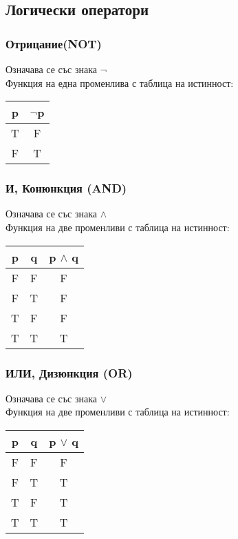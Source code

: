 \documentclass[fleqn, 12pt]{article}
\begin{document}
\subsection{Логически оператори}

\subsubsection{Отрицание(NOT)}
Означава се със знака $\neg$\\
Функция на една променлива с таблица на истинност: 
\begin{table}[htp]
  \begin{center}
    \begin{tabular}{|c|c|} 
\hline
      \textbf{p} & \textbf{$\neg$p} \\
      \hline
      T & F \\
\hline
      F & T \\
\hline
    \end{tabular}
  \end{center}
\end{table}

\subsubsection{И, Конюнкция (AND)}
Означава се със знака $\land$\\
Функция на две променливи с таблица на истинност: 
\begin{table}[htp]
  \begin{center}
    \begin{tabular}{|c|c|c|} 
\hline
      \textbf{p} & \textbf{q}  & \textbf{p $\land$ q} \\
      \hline
	F & F & F \\
\hline
	F & T & F \\
\hline
	T & F & F \\
\hline
 	T & T & T \\
\hline
    \end{tabular}
  \end{center}
\end{table}

\subsubsection{ИЛИ, Дизюнкция (OR)}
Означава се със знака $\lor$\\
Функция на две променливи с таблица на истинност: 
\begin{table}[htp]
  \begin{center}
    \begin{tabular}{|c|c|c|} 
\hline
      \textbf{p} & \textbf{q}  & \textbf{p $\lor$ q} \\
      \hline
	F & F & F \\
\hline
	F & T & T \\
\hline
	T & F & T \\
\hline
 	T & T & T \\
\hline
    \end{tabular}
  \end{center}
\end{table}
\end{document}
